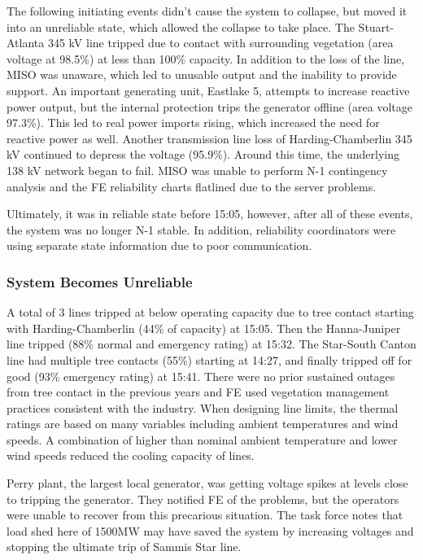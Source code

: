 The following initiating events didn't cause the system to collapse, but moved it into an unreliable state, which allowed the collapse to take place. The Stuart-Atlanta 345 kV line tripped due to contact with surrounding vegetation (area voltage at 98.5\%) at less than 100\% capacity.  In addition to the loss of the line, MISO was unaware, which led to unusable output and the inability to provide support.  An important generating unit, Eastlake 5, attempts to increase reactive power output, but the internal protection trips the generator offline (area voltage 97.3\%).  This led to real power imports rising, which increased the need for reactive power as well.  Another transmission line loss of Harding-Chamberlin 345 kV continued to depress the voltage (95.9\%).  Around this time, the underlying 138 kV network began to fail.   MISO was unable to perform N-1 contingency analysis and the FE reliability charts flatlined due to the server problems.

Ultimately, it was in reliable state before 15:05, however, after all of these events, the system was no longer N-1 stable.  In addition, reliability coordinators were using separate state information due to poor communication.  

\subsubsection{System Becomes Unreliable}

A total of 3 lines tripped at below operating capacity due to tree contact starting with Harding-Chamberlin (44\% of capacity) at 15:05.  Then the Hanna-Juniper line tripped (88\% normal and emergency rating) at 15:32.  The Star-South Canton line had multiple tree contacts (55\%) starting at 14:27, and finally tripped off for good (93\% emergency rating)  at 15:41.  There were no prior sustained outages from tree contact in the previous years and FE used vegetation management practices consistent with the industry.  When designing line limits, the thermal ratings are based on many variables including ambient temperatures and wind speeds.  A combination of higher than nominal ambient temperature and lower wind speeds reduced the cooling capacity of lines.

Perry plant, the largest local generator, was getting voltage spikes at levels close to tripping the generator.  They notified FE of the problems, but the operators were unable to recover from this precarious situation.  The task force notes that load shed here of 1500MW may have saved the system by increasing voltages and stopping the ultimate trip of Sammis Star line.

